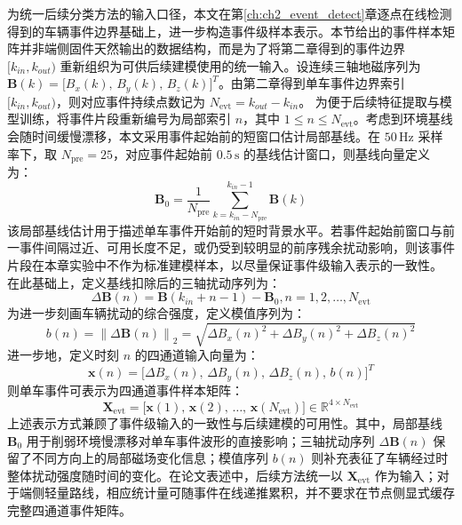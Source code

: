 \documentclass{xdupgthesis}
\begin{document}
为统一后续分类方法的输入口径，本文在第\ref{ch:ch2_event_detect}章逐点在线检测得到的车辆事件边界基础上，进一步构造事件级样本表示。本节给出的事件样本矩阵并非端侧固件天然输出的数据结构，而是为了将第二章得到的事件边界 $[k_{in},k_{out})$ 重新组织为可供后续建模使用的统一输入。设连续三轴地磁序列为 $\mathbf{B}(k)=\big[B_x(k),\,B_y(k),\,B_z(k)\big]^T$。由第二章得到单车事件边界索引 $[k_{in},k_{out})$，则对应事件持续点数记为 $N_{\mathrm{evt}}=k_{out}-k_{in}$。
为便于后续特征提取与模型训练，将事件片段重新编号为局部索引 $n$，其中 $1\le n\le N_{\mathrm{evt}}$。考虑到环境基线会随时间缓慢漂移，本文采用事件起始前的短窗口估计局部基线。在 $50\,\mathrm{Hz}$ 采样率下，取 $N_{\mathrm{pre}}=25$，对应事件起始前 $0.5\,\mathrm{s}$ 的基线估计窗口，则基线向量定义为：
\begin{equation}
    \mathbf{B}_0=\frac{1}{N_{\mathrm{pre}}}\sum_{k=k_{in}-N_{\mathrm{pre}}}^{k_{in}-1}\mathbf{B}(k)
\end{equation}
该局部基线估计用于描述单车事件开始前的短时背景水平。若事件起始前窗口与前一事件间隔过近、可用长度不足，或仍受到较明显的前序残余扰动影响，则该事件片段在本章实验中不作为标准建模样本，以尽量保证事件级输入表示的一致性。
在此基础上，定义基线扣除后的三轴扰动序列为：
\begin{equation}
    \Delta\mathbf{B}(n)=\mathbf{B}(k_{in}+n-1)-\mathbf{B}_0, n=1,2,\ldots,N_{\mathrm{evt}}
\end{equation}
为进一步刻画车辆扰动的综合强度，定义模值序列为：
\begin{equation}
    b(n)=\left\|\Delta\mathbf{B}(n)\right\|_2
    =\sqrt{\Delta B_x(n)^2+\Delta B_y(n)^2+\Delta B_z(n)^2}
\end{equation}
进一步地，定义时刻 $n$ 的四通道输入向量为：
\begin{equation}
    \mathbf{x}(n)=\big[\Delta B_x(n),\,\Delta B_y(n),\,\Delta B_z(n),\,b(n)\big]^T
\end{equation}
则单车事件可表示为四通道事件样本矩阵：
\begin{equation}
    \mathbf{X}_{\mathrm{evt}}=
    \big[\mathbf{x}(1),\,\mathbf{x}(2),\,\ldots,\,\mathbf{x}(N_{\mathrm{evt}})\big]
    \in \mathbb{R}^{4\times N_{\mathrm{evt}}}
\end{equation}
上述表示方式兼顾了事件级输入的一致性与后续建模的可用性。其中，局部基线 $\mathbf{B}_0$ 用于削弱环境慢漂移对单车事件波形的直接影响；三轴扰动序列 $\Delta\mathbf{B}(n)$ 保留了不同方向上的局部磁场变化信息；模值序列 $b(n)$ 则补充表征了车辆经过时整体扰动强度随时间的变化。在论文表述中，后续方法统一以 $\mathbf{X}_{\mathrm{evt}}$ 作为输入；对于端侧轻量路线，相应统计量可随事件在线递推累积，并不要求在节点侧显式缓存完整四通道事件矩阵。
\end{document}
